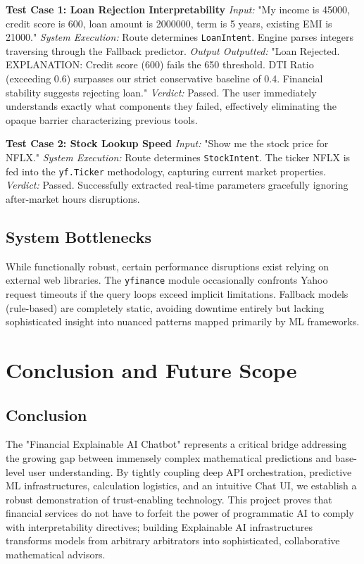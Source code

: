 \documentclass[12pt,a4paper]{report}
\begin{document}
\textbf{Test Case 1: Loan Rejection Interpretability}
\textit{Input:} "My income is 45000, credit score is 600, loan amount is 2000000, term is 5 years, existing EMI is 21000."
\textit{System Execution:} Route determines \texttt{LoanIntent}. Engine parses integers traversing through the Fallback predictor.
\textit{Output Outputted:} "Loan Rejected. EXPLANATION: Credit score (600) fails the 650 threshold. DTI Ratio (exceeding 0.6) surpasses our strict conservative baseline of 0.4. Financial stability suggests rejecting loan."
\textit{Verdict:} Passed. The user immediately understands exactly what components they failed, effectively eliminating the opaque barrier characterizing previous tools.

\textbf{Test Case 2: Stock Lookup Speed}
\textit{Input:} "Show me the stock price for NFLX."
\textit{System Execution:} Route determines \texttt{StockIntent}. The ticker NFLX is fed into the \texttt{yf.Ticker} methodology, capturing current market properties.
\textit{Verdict:} Passed. Successfully extracted real-time parameters gracefully ignoring after-market hours disruptions.

\section{System Bottlenecks}
While functionally robust, certain performance disruptions exist relying on external web libraries. The \texttt{yfinance} module occasionally confronts Yahoo request timeouts if the query loops exceed implicit limitations. Fallback models (rule-based) are completely static, avoiding downtime entirely but lacking sophisticated insight into nuanced patterns mapped primarily by ML frameworks.

\chapter{Conclusion and Future Scope}

\section{Conclusion}
The "Financial Explainable AI Chatbot" represents a critical bridge addressing the growing gap between immensely complex mathematical predictions and base-level user understanding. By tightly coupling deep API orchestration, predictive ML infrastructures, calculation logistics, and an intuitive Chat UI, we establish a robust demonstration of trust-enabling technology. This project proves that financial services do not have to forfeit the power of programmatic AI to comply with interpretability directives; building Explainable AI infrastructures transforms models from arbitrary arbitrators into sophisticated, collaborative mathematical advisors.
\end{document}
